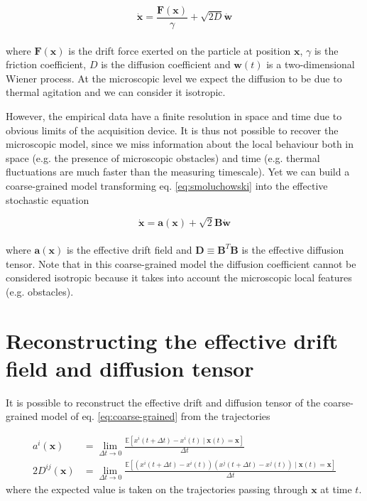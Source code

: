\documentclass[a4paper]{article}
\begin{document}
\begin{equation} \label{eq:smoluchowski}
\dot{\bm{x}} = \frac{\bm{F}(\bm{x})}{\gamma} + \sqrt{2D} \dot{\bm{w}}
\end{equation}
\\
where $\bm{F}(\bm{x})$ is the drift force exerted on the particle at position $\bm{x}$, $\gamma$ is the friction coefficient, $D$ is the diffusion coefficient and $\bm{w}(t)$ is a two-dimensional Wiener process. At the microscopic level we expect the diffusion to be due to thermal agitation and we can consider it isotropic.

However, the empirical data have a finite resolution in space and time due to obvious limits of the acquisition device. It is thus not possible to recover the microscopic model, since we miss information about the local behaviour both in space (e.g. the presence of microscopic obstacles) and time (e.g. thermal fluctuations are much faster than the measuring timescale). Yet we can build a coarse-grained model transforming eq. \ref{eq:smoluchowski} into the effective stochastic equation \cite{hoze2012} \cite{hoze2014}

\begin{equation} \label{eq:coarse-grained}
\dot{\bm{x}} = \bm{a}(\bm{x}) + \sqrt{2}\bm{B} \dot{\bm{w}}
\end{equation}
\\
where $\bm{a}(\bm{x})$ is the effective drift field and $\bm{D} \equiv \bm{B}^T\bm{B}$ is the effective diffusion tensor. Note that in this coarse-grained model the diffusion coefficient cannot be considered isotropic because it takes into account the microscopic local features (e.g. obstacles).

\section{Reconstructing the effective drift field and diffusion tensor}

It is possible to reconstruct the effective drift and diffusion tensor of the coarse-grained model of eq. \ref{eq:coarse-grained} from the trajectories \cite{hoze2014} \cite{schuss}

\begin{align}
a^i(\bm{x}) &= \lim_{\Delta t \to 0}\frac{\mathbb{E}\left[x^i(t + \Delta t) - x^i(t) \mid \bm{x}(t) = \bm{x}\right]}{\Delta t} \label{eq:drift}\\
2D^{ij}(\bm{x}) &= \lim_{\Delta t \to 0}\frac{\mathbb{E}\left[\left(x^i(t + \Delta t) - x^i(t)\right)\left(x^j(t + \Delta t) - x^j(t)\right) \mid \bm{x}(t) = \bm{x}\right]}{\Delta t} \label{eq:diff}
\end{align}
where the expected value is taken on the trajectories passing through $\bm{x}$ at time $t$.
\end{document}
